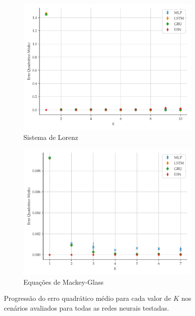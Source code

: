 \documentclass[a4paper, 12pt]{article}
\begin{document}
\begin{figure}[!ht]
     \centering
     \begin{subfigure}[t]{0.45\textwidth}
     \centering
         \includegraphics[scale=0.39]{progressao-k-lorenz.pdf}
         \caption{Sistema de Lorenz}
     \end{subfigure}
     \centering
     \begin{subfigure}[t]{0.45\textwidth} 
     \centering
         \includegraphics[scale=0.39]{progressao-k-mackeyglass.pdf}
         \caption{Equações de Mackey-Glass}
     \end{subfigure}  
     \centering   
     \caption{Progressão do erro quadrático médio para cada valor de $K$ nos cenários avaliados para todas as redes neurais testadas.}
     \label{fig:mse-progression}
\end{figure}
\end{document}
